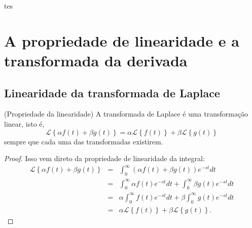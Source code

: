 tes%
\chapter{A propriedade de linearidade e a transformada da derivada}
\section{Linearidade da transformada de Laplace}
\begin{teo}{\label{prop_lin}}(Propriedade da linearidade)
A transformada de Laplace é uma transformação linear, isto é,
\begin{equation}
\mathcal{L }\left\{\alpha f(t)+\beta g(t)\right\}=\alpha \mathcal{L }\left\{ f(t)\right\}+\beta\mathcal{L }\left\{g(t)\right\}
\end{equation}
sempre que cada uma das transformadas existirem.
\end{teo}
\begin{proof}
Isso vem direto da propriedade de linearidade da integral:
\begin{eqnarray*}
\mathcal{L }\left\{\alpha f(t)+\beta g(t)\right\}&=&\int_0^\infty \left(\alpha f(t)+\beta g(t)\right)e^{-st}dt\\
&=&\int_0^\infty \alpha f(t)e^{-st}dt+\int_0^\infty\beta g(t)e^{-st}dt\\
&=&\alpha\int_0^\infty  f(t)e^{-st}dt+\beta\int_0^\infty g(t)e^{-st}dt\\
&=&\alpha \mathcal{L }\left\{ f(t)\right\}+\beta\mathcal{L }\left\{g(t)\right\}.
\end{eqnarray*}
\end{proof}

